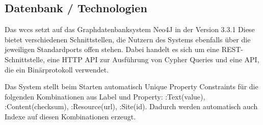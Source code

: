 \subsection{Datenbank / Technologien}
    Das \gls{wccs} setzt auf das Graphdatenbanksystem Neo4J in der Version 3.3.1
    Diese bietet verschiedenen Schnittstellen, die Nutzern des Systems ebenfalls über die jeweiligen Standardports offen stehen.
    Dabei handelt es sich um eine REST-Schnittstelle, %
    eine HTTP API zur Ausführung von Cypher Queries %
    und eine API, die ein Binärprotokoll verwendet. %

    Das System stellt beim Starten automatisch Unique Property Constraints %
    für die folgenden Kombinationen aus Label und Property:
    :Text(value), :Content(checksum), :Resource(url), :Site(id).
    Dadurch werden automatisch auch Indexe auf diesen Kombinationen erzeugt.